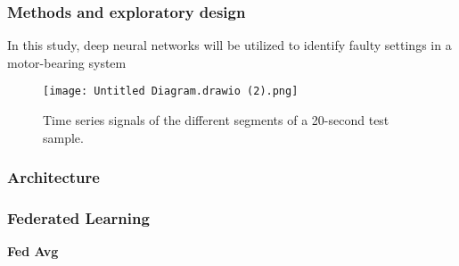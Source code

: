 \documentclass[9pt]{beamer}
\begin{document}
\begin{frame}
\frametitle{Methods and exploratory design}
In this study, deep neural networks will
be utilized to identify faulty settings in a motor-bearing system


 \begin{figure}


\texttt{[image: Untitled Diagram.drawio (2).png]}

    \caption{Time series signals of the different segments of a 20-second test sample.}\label{fig:Signal_Amplitude}











\end{figure}

\end{frame}




\begin{frame}
\frametitle{Architecture}




\end{frame}


\begin{frame}
\frametitle{Federated Learning}

\textbf{Fed Avg}



\end{frame}
\end{document}
